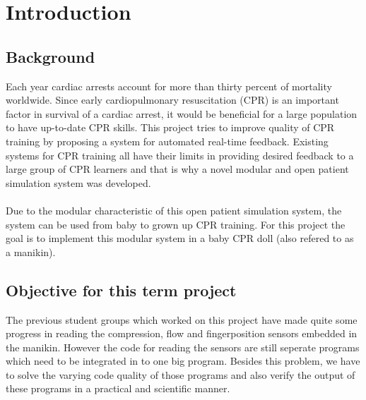 \chapter{Introduction}
\label{chapter:intro}

\section{Background}
Each year cardiac arrests account for more than thirty percent of mortality worldwide. Since
early cardiopulmonary resuscitation (CPR) is an important factor in survival of a cardiac arrest,
it would be beneficial for a large population to have up-to-date CPR skills. This project tries to
improve quality of CPR training by proposing a system for automated real-time feedback.
Existing systems for CPR training all have their limits in providing desired feedback to a large
group of CPR learners and that is why a novel modular and open patient simulation system was
developed. \cite{jakortenmsc}\\\\
Due to the modular characteristic of this open patient simulation system, the system can be used from baby to grown up CPR training. 
For this project the goal is to implement this modular system in a baby CPR doll (also refered to as a manikin).
\section{Objective for this term project}
The previous student groups which worked on this project have made quite some progress in reading the compression, flow and fingerposition sensors embedded in the manikin.
However the code for reading the sensors are still seperate programs which need to be integrated in to one big program. Besides this problem, we have to solve the varying code quality of those programs and also verify the output of these programs in a practical and scientific manner.
